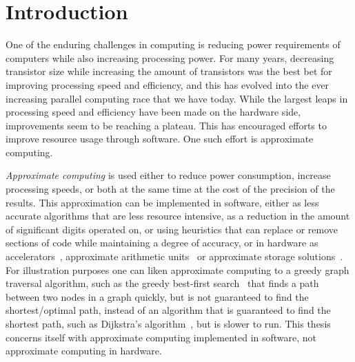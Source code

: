 

\section{Introduction}

One of the enduring challenges in computing is reducing power requirements of computers while also increasing processing power. For many years, decreasing transistor size while increasing the amount of transistors was the best bet for improving processing speed and efficiency, and this has evolved into the ever increasing parallel computing race that we have today. While the largest leaps in processing speed and efficiency have been made on the hardware side, improvements seem to be reaching a plateau. This has encouraged efforts to improve resource usage through software. One such effort is approximate computing. 

\emph{Approximate computing} is used either to reduce power consumption, increase processing speeds, or both at the same time at the cost of the precision of the results. This approximation can be implemented in software, either as less accurate algorithms that are less resource intensive, as a reduction in the amount of significant digits operated on, or using heuristics that can replace or remove sections of code while maintaining a degree of accuracy, or in hardware as accelerators~\citep{moreau2015snnap}, approximate arithmetic units~\citep{han2013approximate} or approximate storage solutions~\citep{nguyen2020approximate}. For illustration purposes one can liken approximate computing to a greedy graph traversal algorithm, such as the greedy best-first search~\citep{coles2007marvin} that finds a path between two nodes in a graph quickly, but is not guaranteed to find the shortest/optimal path, instead of an algorithm that is guaranteed to find the shortest path, such as Dijkstra's algorithm~\citep{dijkstra1959note}, but is slower to run. This thesis concerns itself with approximate computing implemented in software, not approximate computing in hardware. 

